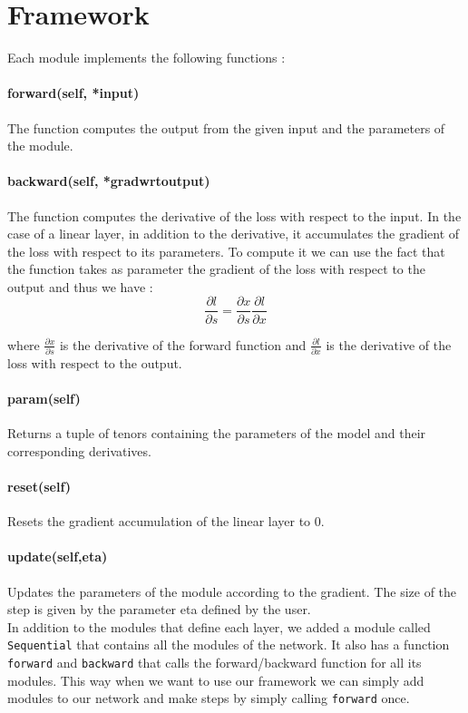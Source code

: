 \documentclass{article}
\begin{document}
\thispagestyle{fancy}

\section{Framework}

Each module implements the following functions : 

\paragraph{forward(self, *input)}
The function computes the output from the given input and the parameters of the module.
    
\paragraph{backward(self, *gradwrtoutput)}
The function computes the derivative of the loss with respect to the input. In the case of a linear layer, in addition to the derivative, it accumulates the gradient of the loss with respect to its parameters. To compute it we can use the fact that the function takes as parameter the gradient of the loss with respect to the output and thus we have : 
\[\frac{\partial l}{\partial s} = \frac{\partial x}{\partial s} \frac{\partial l}{\partial x}\] 

where $\frac{\partial x}{\partial s}$ is the derivative of the forward function and $\frac{\partial l}{\partial x}$ is the derivative of the loss with respect to the output.

\paragraph{param(self)}
Returns a tuple of tenors containing the parameters of the model and their corresponding derivatives. 
    
\paragraph{reset(self)}
Resets the gradient accumulation of the linear layer to 0.
    
\paragraph{update(self,eta)}
Updates the parameters of the module according to the gradient. The size of the step is given by the parameter eta defined by the user. 
\\
In addition to the modules that define each layer, we added a module called \verb|Sequential| that contains all the modules of the network. It also has a function \verb|forward| and \verb|backward| that calls the forward/backward function for all its modules. This way when we want to use our framework we can simply add modules to our network and make steps by simply calling \verb|forward| once. 
\\
\end{document}
